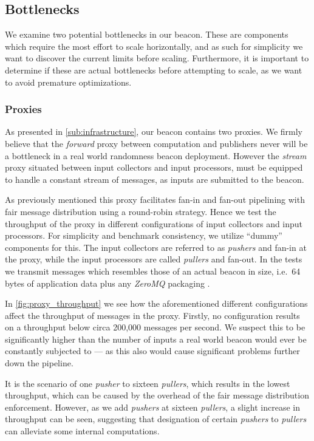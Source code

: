 \subsection{Bottlenecks}%
\label{sub:bottlenecks}

We examine two potential bottlenecks in our beacon.
These are components which require the most effort to scale horizontally, and as such for simplicity we want to discover the current limits before scaling.
Furthermore, it is important to determine if these are actual bottlenecks before attempting to scale, as we want to avoid premature optimizations.

\subsubsection{Proxies}%
\label{ssub:proxies}
As presented in \vref{sub:infrastructure}, our beacon contains two proxies.
We firmly believe that the \textit{forward} proxy between computation and publishers never will be a bottleneck in a real world randomness beacon deployment.
However the \textit{stream} proxy situated between input collectors and input processors, must be equipped to handle a constant stream of messages, as inputs are submitted to the beacon.

As previously mentioned this proxy facilitates fan-in and fan-out pipelining with fair message distribution using a round-robin strategy.
Hence we test the throughput of the proxy in different configurations of input collectors and input processors.
For simplicity and benchmark consistency, we utilize \enquote{dummy} components for this.
The input collectors are referred to as \textit{pushers} and fan-in at the proxy, while the input processors are called \textit{pullers} and fan-out.
In the tests we transmit messages which resembles those of an actual beacon in size, i.e.\ 64 bytes of application data plus any \textit{ZeroMQ} packaging .

In \vref{fig:proxy_throughput} we see how the aforementioned different configurations affect the throughput of messages in the proxy.
Firstly, no configuration results on a throughput below circa 200,000 messages per second.
We suspect this to be significantly higher than the number of inputs a real world beacon would ever be constantly subjected to --- as this also would cause significant problems further down the pipeline.

It is the scenario of one \textit{pusher} to sixteen \textit{pullers}, which results in the lowest throughput, which can be caused by the overhead of the fair message distribution enforcement.
However, as we add \textit{pushers} at sixteen \textit{pullers}, a slight increase in throughput can be seen, suggesting that designation of certain \textit{pushers} to \textit{pullers} can alleviate some internal computations.


